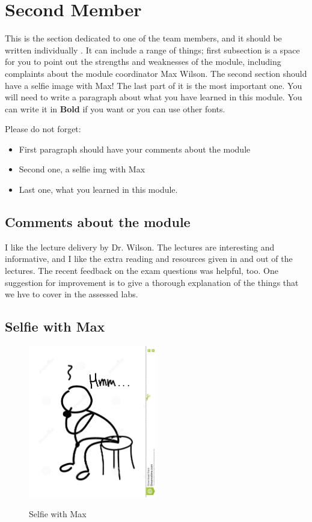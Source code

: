 \section{Second Member}
This is the section dedicated to one of the team members, and it should be written individually . It can include a range of things; first subsection is a space for you to point out the strengths and weaknesses of the module, including complaints about the module coordinator Max Wilson. The second section should have a selfie image with Max! The last part of it is the most important one. You will need to write a paragraph about what you have learned in this module. You can write it in \textbf{Bold} if you want or you can use other fonts. 

Please do not forget:
\begin{itemize}
	\item First paragraph should have your comments about the module
	\item Second one, a selfie img with Max
	\item Last one, what you learned in this module.
\end{itemize}

\subsection{Comments about the module}
I like the lecture delivery by Dr. Wilson. The lectures are interesting and informative, and I like the extra reading and resources given in and out of the lectures. The recent feedback on the exam questions was helpful, too. One suggestion for improvement is to give a thorough explanation of the things that we hve to cover in the assessed labs.
\subsection{Selfie with Max}


\begin{figure}[h]
\caption{Selfie with Max}
\centering
\includegraphics[width=0.5\textwidth]{selfie.jpg}
\label{fig:selfie}
\end{figure}

